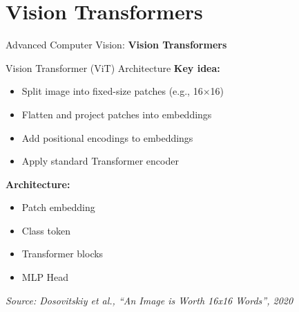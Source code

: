 \section{Vision Transformers}
\begin{frame}{}
    \LARGE Advanced Computer Vision: \textbf{Vision Transformers}
\end{frame}

\begin{frame}{Vision Transformer (ViT) Architecture}
    \textbf{Key idea:}
    \begin{itemize}
        \item Split image into fixed-size patches (e.g., 16$\times$16)
        \item Flatten and project patches into embeddings
        \item Add positional encodings to embeddings
        \item Apply standard Transformer encoder
    \end{itemize}
    \vspace{0.5em}
    \textbf{Architecture:}
    \begin{itemize}
        \item Patch embedding
        \item Class token
        \item Transformer blocks
        \item MLP Head
    \end{itemize}
    \footnotesize{\textit{Source: Dosovitskiy et al., ``An Image is Worth 16x16 Words'', 2020}}
\end{frame}

